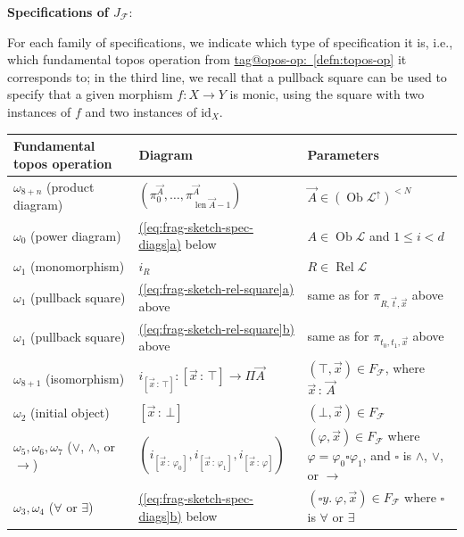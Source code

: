\documentclass{amsart}
\makeatletter
\newcommand\cF{\mathcal{F}}
\newcommand\cL{\mathcal{L}}
\newcommand\id{\mathrm{id}}
\newcommand\len{\operatorname{len}}
\newcommand\Ob{\operatorname{Ob}}
\renewcommand\phi{\varphi}
\newcommand\Rel{\operatorname{Rel}}
\newcommand\tolon{{\,:\,}}
\newcommand\up{\uparrow}
\newcommand\vA{\vek{A}}
\newcommand\vek[1]{{\vec{#1}}}
\newcommand\vt{\vek{t}}
\newcommand\vx{\vek{x}}
\newcommand\tagword[1]{\csname tag@#1\endcsname}
\def\label@tag#1:#2\@nil{#1}
\newcommand\labeltag[1]{\label@tag#1:\@nil}
\newcommand\jref[1]{%
  \texorpdfstring%
    {\hyperref[#1]{\tagword{\labeltag{#1}}~\ref*{#1}}}%
    {\tagword{\labeltag{#1}}~\ref*{#1}}%
}
\newcommand\prerefpost[3]{%
  \texorpdfstring%
    {\hyperref[#2]{#1\ref*{#2}#3}}%
    {#1\ref*{#2}#3}%
}
\theoremstyle{definition}
\theoremstyle{remark}
\theoremstyle{plainwithref}
\makeatother
\begin{document}
\begin{defn}
  \noindent
  \textbf{Specifications of \( J_{\cF} \)}:

  For each family of specifications, we indicate which type of specification it is, i.e., which fundamental topos operation from \jref{defn:topos-op} it corresponds to; in the third line, we recall that a pullback square can be used to specify that a given morphism \( f \colon X \to Y \) is monic, using the square with two instances of \( f \) and two instances of \( \id_X \).
 \begin{center}
   \begin{tabular}{l|l|l}
     Fundamental topos operation & Diagram & Parameters \\
     \hline
     \( \omega_{8 + n} \) (product diagram) & \( (\pi_0^{\vA}, \ldots, \pi_{\len \vA-1}^{\vA}) \) & \( \vA \in (\Ob \cL^{\up})^{< N} \) \\
     \( \omega_0 \) (power diagram) & \prerefpost{(}{eq:frag-sketch-spec-diags}{a)} below & \( A \in \Ob \cL \) and \( 1 \le i < d \) \\
     \( \omega_1 \) (monomorphism) & \( i_R \) & \( R \in \Rel \cL \) \\
     \( \omega_1 \) (pullback square) & \prerefpost{(}{eq:frag-sketch-rel-square}{a)} above &
     same as for \( \pi_{R, \vt, \vx} \) above \\
     \( \omega_1 \) (pullback square) & \prerefpost{(}{eq:frag-sketch-rel-square}{b)} above &
     same as for \( \pi_{t_0, t_1, \vx} \) above \\
     \( \omega_{8 + 1} \) (isomorphism) & \( i_{[\vx \tolon \top]} \colon [\vx \tolon \top] \to \Pi \vA \) & \( (\top, \vx) \in F_\cF \), where \( \vx \tolon \vA \) \\
     \( \omega_2 \) (initial object) & \( [\vx \tolon \bot] \) & \( (\bot, \vx) \in F_\cF \) \\
     \( \omega_5,\omega_6,\omega_7 \) (\( \vee \), \( \wedge \), or \( \to \)) & \( (i_{[\vx \tolon \phi_0]}, i_{[\vx \tolon \phi_1]}, i_{[\vx \tolon \phi]}) \) & \( (\phi, \vx) \in F_\cF \) where \( \phi = \phi_0 \square \phi_1 \), and \( \square \) is \( \wedge \), \( \vee \), or \( \to \) \\
     \( \omega_3,\omega_4 \) (\( \forall \) or \( \exists \)) &
     \prerefpost{(}{eq:frag-sketch-spec-diags}{b)} below &
     \( (\square y.\ \phi, \vx) \in F_\cF \) where \( \square \) is \( \forall \) or \( \exists \)
   \end{tabular}
 \end{center}


\end{defn}
\end{document}
